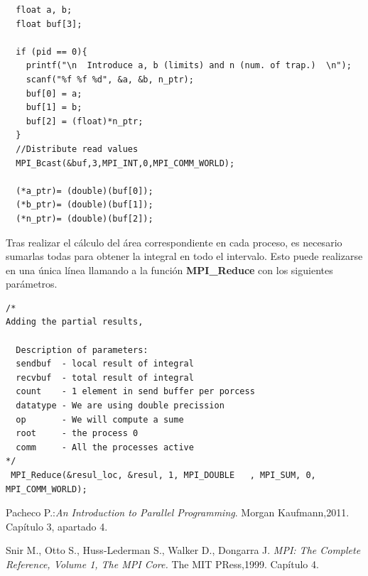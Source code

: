 \documentclass[es,gi]{ifirak}
\begin{document}
\begin{multicols}{2}
\begin{lstlisting}
  float a, b;
  float buf[3];
  
  if (pid == 0){
	printf("\n  Introduce a, b (limits) and n (num. of trap.)  \n");
	scanf("%f %f %d", &a, &b, n_ptr);
	buf[0] = a; 	
	buf[1] = b;
	buf[2] = (float)*n_ptr;
  }
  //Distribute read values
  MPI_Bcast(&buf,3,MPI_INT,0,MPI_COMM_WORLD);

  (*a_ptr)= (double)(buf[0]);
  (*b_ptr)= (double)(buf[1]);
  (*n_ptr)= (double)(buf[2]);
\end{lstlisting}

Tras realizar el cálculo del área correspondiente en cada proceso, es necesario sumarlas todas para obtener la integral en todo el intervalo. Esto puede realizarse en una única línea llamando a la función \textbf{MPI\_Reduce} con los siguientes parámetros.

\begin{lstlisting}
/* 
Adding the partial results,

  Description of parameters:
  sendbuf  - local result of integral
  recvbuf  - total result of integral
  count    - 1 element in send buffer per porcess
  datatype - We are using double precission
  op       - We will compute a sume
  root     - the process 0
  comm     - All the processes active 
*/
 MPI_Reduce(&resul_loc, &resul, 1, MPI_DOUBLE	, MPI_SUM, 0, MPI_COMM_WORLD);
\end{lstlisting}


\begin{thebibliography}{rules}
 Pacheco P.:\textit{An Introduction to Parallel Programming}. Morgan Kaufmann,2011. Capítulo 3, apartado 4. 

 Snir M., Otto S., Huss-Lederman S., Walker D., Dongarra J. \textit{MPI: The Complete Reference, Volume 1, The MPI Core.} The MIT PRess,1999. Capítulo 4.

\end{thebibliography}

\end{multicols}
\end{document}
